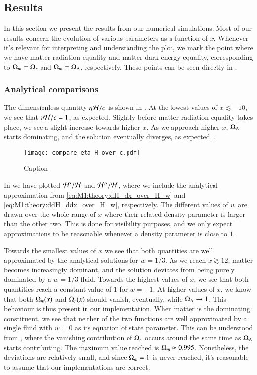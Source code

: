 

\subsection{Results}\label{M1:results}
In this section we present the results from our numerical simulations. Most of our results concern the evolution of various parameters as a function of $x$. Whenever it's relevant for interpreting and understanding the plot, we mark the point where we have matter-radiation equality and matter-dark energy equality, corresponding to $\Omega_{m}=\Omega_{r}$ and $\Omega_{m}=\Omega_{\Lambda}$, respectively. These points can be seen directly in . 

\subsubsection{Analytical comparisons }
The dimensionless quantity $\eta\mathcal{H}/c$ is shown in . At the lowest values of $x\lesssim-10$, we see that $\eta\mathcal{H}/c=1$, as expected. Slightly before matter-radiation equality takes place, we see a slight increase towards higher $x$. As we approach higher $x$, $\Omega_{\Lambda}$ starts dominating, and the solution eventually diverges, as expected. .      
\begin{figure}[ht!]
    \texttt{[image: compare\_eta\_H\_over\_c.pdf]}
    \caption{Caption}
    \label{fig:M1:eta_H_over_c}
\end{figure}

In  we have plotted $\mathcal{H}'/\mathcal{H}$ and $\mathcal{H}''/\mathcal{H}$, where we include the analytical approximation from \eqref{eq:M1:theory:dH_dx_over_H_w} and \eqref{eq:M1:theory:ddH_ddx_over_H_w}, respectively. The different values of $w$ are drawn over the whole range of $x$ where their related density parameter is larger than the other two. This is done for visibility purposes, and we only expect approximations to be reasonable whenever a density parameter is close to $1$. 

Towards the smallest values of $x$ we see that both quantities are well approximated by the analytical solutions for $w=1/3$. As we reach $x\gtrsim12$, matter becomes increasingly dominant, and the solution deviates from being purely dominated by a $w=1/3$ fluid. Towards the highest values of $x$, we see that both quantities reach a constant value of $1$ for $w=-1$. At higher values of $x$, we know that both $\Omega_{m}(x)$ and $\Omega_{r}(x)$ should vanish, eventually, while $\Omega_{\Lambda}\to1$. This behaviour is thus present in our implementation. When matter is the dominating constituent, we see that neither of the two functions are well approximated by a single fluid with $w=0$ as its equation of state parameter. This can be understood from , where the vanishing contribution of $\Omega_{r}$ occurs around the same time as $\Omega_{\Lambda}$ starts contributing. The maximum value reached is $\Omega_{m}\approx0.995$. Nonetheless, the deviations are relatively small, and since $\Omega_{m}=1$ is never reached, it's reasonable to assume that our implementations are correct.     
 

